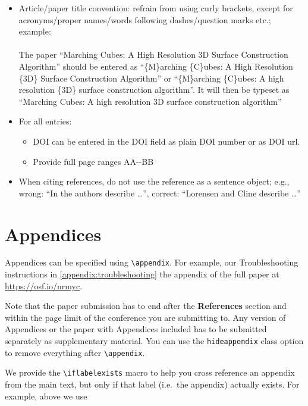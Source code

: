 \documentclass[journal]{vgtc}                     %
\begin{document}
\begin{itemize}
  \item Article/paper title convention: refrain from using curly brackets, except for acronyms/proper names/words following dashes/question marks etc.; example:\\\\
        The paper ``Marching Cubes: A High Resolution 3D Surface Construction Algorithm'' should be entered as ``\{M\}arching \{C\}ubes: A High Resolution \{3D\} Surface Construction Algorithm'' or  ``\{M\}arching \{C\}ubes: A high resolution \{3D\} surface construction algorithm''.
        It will then be typeset as ``Marching Cubes: A high resolution 3D surface construction algorithm''
  \item For all entries:
        \begin{itemize}
  	      \item DOI can be entered in the DOI field as plain DOI number or as DOI url.
  	      \item Provide full page ranges AA-{}-BB
        \end{itemize}
  \item When citing references, do not use the reference as a sentence object; e.g., wrong: ``In \cite{Lorensen:1987:MCA} the authors describe \dots'', correct: ``Lorensen and Cline \cite{Lorensen:1987:MCA} describe \dots''
\end{itemize}

\section{Appendices}
\label{sec:appendices_inst}

Appendices can be specified using \verb|\appendix|.
For example, our Troubleshooting instructions in
  {\cref{appendix:troubleshooting}}
  {the appendix of the full paper at \url{https://osf.io/nrmyc}}.

Note that the paper submission has to end after the \textbf{References} section and within the page limit of the conference you are submitting to.
Any version of Appendices or the paper with Appendices included has to be submitted separately as supplementary material.
You can use the \verb|hideappendix| class option to remove everything after \verb|\appendix|.

We provide the \verb|\iflabelexists| macro to help you cross reference an appendix from the main text, but only if that label (i.e.\ the appendix) actually exists.
For example, above we use 
\end{document}
